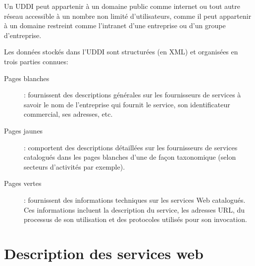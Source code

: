       Un \textsc{UDDI} peut appartenir à un domaine public comme internet ou
      tout autre réseau accessible à un nombre non limité d’utilisateurs,
      comme il peut appartenir à un domaine restreint comme l'intranet d’une
      entreprise ou d'un groupe d'entreprise.

      Les données stockés dans l'UDDI sont structurées (en \textsc{XML}) et
      organisées en trois parties connues:

      \begin{description} %
      \item[Pages blanches]: fournissent des descriptions générales sur les
        fournisseurs de services à savoir le nom de l'entreprise qui fournit
        le service, son identificateur commercial, ses adresses, etc.
        
      \item[Pages jaunes]: comportent des descriptions détaillées sur les
        fournisseurs de services catalogués dans les pages blanches d'une de
        façon taxonomique (selon secteurs d'activités par exemple).
        
      \item[Pages vertes]: fournissent des informations techniques sur les
        services Web catalogués. Ces informations incluent la description du
        service, les adresses \textsc{URL}, du processus de son utilisation
        et des protocoles utilisés pour son invocation.
        
      \end{description}


  \section{Description des services web}

